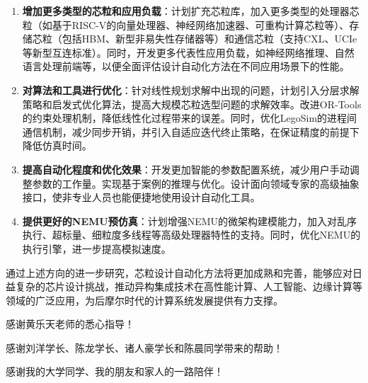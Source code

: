 \documentclass[bachelor]{thesis-uestc}
\begin{document}
\begin{enumerate}
    \item \textbf{增加更多类型的芯粒和应用负载}：计划扩充芯粒库，加入更多类型的处理器芯粒（如基于RISC-V的向量处理器、神经网络加速器、可重构计算芯粒等）、存储芯粒（包括HBM、新型非易失性存储器等）和通信芯粒（支持CXL、UCIe等新型互连标准）。同时，开发更多代表性应用负载，如神经网络推理、自然语言处理前端等，以便全面评估设计自动化方法在不同应用场景下的性能。
    
    \item \textbf{对算法和工具进行优化}：针对线性规划求解中出现的问题，计划引入分层求解策略和启发式优化算法，提高大规模芯粒选型问题的求解效率。改进OR-Tools的约束处理机制，降低线性化过程带来的误差。同时，优化LegoSim的进程间通信机制，减少同步开销，并引入自适应迭代终止策略，在保证精度的前提下降低仿真时间。
    
    \item \textbf{提高自动化程度和优化效果}：开发更加智能的参数配置系统，减少用户手动调整参数的工作量。实现基于案例的推理与优化。设计面向领域专家的高级抽象接口，使非专业人员也能便捷地使用设计自动化工具。
    
    \item \textbf{提供更好的NEMU预仿真}：计划增强NEMU的微架构建模能力，加入对乱序执行、超标量、细粒度多线程等高级处理器特性的支持。同时，优化NEMU的执行引擎，进一步提高模拟速度。


\end{enumerate}

通过上述方向的进一步研究，芯粒设计自动化方法将更加成熟和完善，能够应对日益复杂的芯片设计挑战，推动异构集成技术在高性能计算、人工智能、边缘计算等领域的广泛应用，为后摩尔时代的计算系统发展提供有力支撑。

\thesisacknowledgement
感谢黄乐天老师的悉心指导！


感谢刘洋学长、陈龙学长、诸人豪学长和陈晨同学带来的帮助！


感谢我的大学同学、我的朋友和家人的一路陪伴！


\thesisappendix



\end{document}
